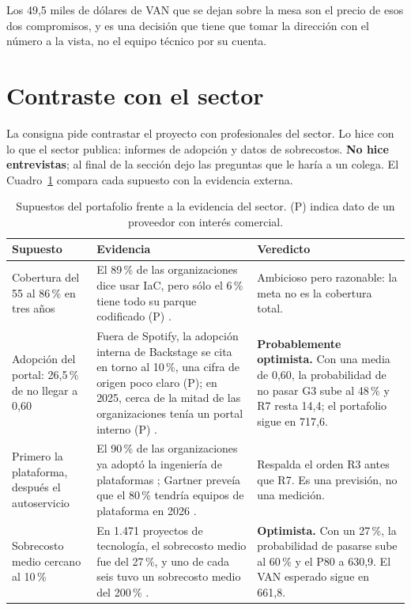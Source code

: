 \documentclass[11pt,letterpaper]{article}
\newcommand{\pct}{\,\%}
\begin{document}
Los 49,5 miles de dólares de VAN que se dejan sobre la mesa son el precio de
esos dos compromisos, y es una decisión que tiene que tomar la dirección con el
número a la vista, no el equipo técnico por su cuenta.

\section{Contraste con el sector}
\label{sec:contraste}

La consigna pide contrastar el proyecto con profesionales del sector. Lo hice
con lo que el sector publica: informes de adopción y datos de sobrecostos.
\textbf{No hice entrevistas}; al final de la sección dejo las preguntas que le
haría a un colega. El Cuadro~\ref{tab:contraste} compara cada supuesto con la
evidencia externa.

\begin{table}[H]
\centering
\footnotesize
\setlength{\tabcolsep}{3.5pt}
\caption{Supuestos del portafolio frente a la evidencia del sector. (P) indica
dato de un proveedor con interés comercial.}
\label{tab:contraste}
\begin{tabularx}{\textwidth}{@{}>{\raggedright\arraybackslash}p{3.1cm}>{\raggedright\arraybackslash}X>{\raggedright\arraybackslash}p{4.6cm}@{}}
\toprule
\textbf{Supuesto} & \textbf{Evidencia} & \textbf{Veredicto} \\
\midrule
Cobertura del 55 al 86\pct{} en tres años
& El 89\pct{} de las organizaciones dice usar IaC, pero sólo el 6\pct{} tiene
  todo su parque codificado (P) \autocite{firefly2025}.
& Ambicioso pero razonable: la meta no es la cobertura total. \\
\addlinespace[2pt]
Adopción del portal: 26,5\pct{} de no llegar a 0,60
& Fuera de Spotify, la adopción interna de Backstage se cita en torno al
  10\pct{}, una cifra de origen poco claro (P); en 2025, cerca de la mitad de
  las organizaciones tenía un portal interno (P) \autocite{port2025,backstage}.
& \textbf{Probablemente optimista.} Con una media de 0,60, la probabilidad de
  no pasar G3 sube al 48\pct{} y R7 resta 14,4; el portafolio sigue en 717,6. \\
\addlinespace[2pt]
Primero la plataforma, después el autoservicio
& El 90\pct{} de las organizaciones ya adoptó la ingeniería de plataformas
  \autocite{dora2025}; Gartner preveía que el 80\pct{} tendría equipos de
  plataforma en 2026 \autocite{gartner2023pe}.
& Respalda el orden R3 antes que R7. Es una previsión, no una medición. \\
\addlinespace[2pt]
Sobrecosto medio cercano al 10\pct
& En 1.471 proyectos de tecnología, el sobrecosto medio fue del 27\pct, y uno
  de cada seis tuvo un sobrecosto medio del 200\pct{}
  \autocite{flyvbjerg2011}.
& \textbf{Optimista.} Con un 27\pct, la probabilidad de pasarse sube al
  60\pct{} y el P80 a 630,9. El VAN esperado sigue en 661,8. \\
\bottomrule
\end{tabularx}
\end{table}
\end{document}
